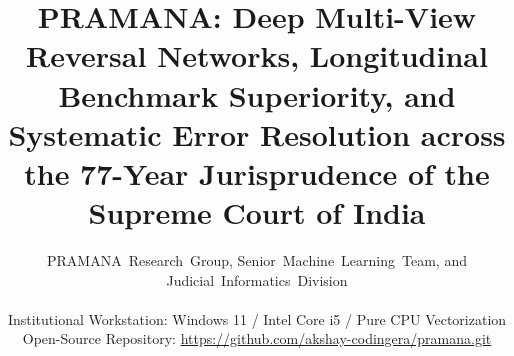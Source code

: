 \documentclass[journal,10pt,twocolumn]{IEEEtran}
\begin{document}
\title{PRAMANA: Deep Multi-View Reversal Networks, Longitudinal Benchmark Superiority, and Systematic Error Resolution across the 77-Year Jurisprudence of the Supreme Court of India}

\author{PRAMANA~Research~Group, Senior~Machine~Learning~Team, and Judicial~Informatics~Division\\
\\
Institutional Workstation: Windows 11 / Intel Core i5 / Pure CPU Vectorization\\
Open-Source Repository: \url{https://github.com/akshay-codingera/pramana.git}
}

\maketitle
\end{document}
